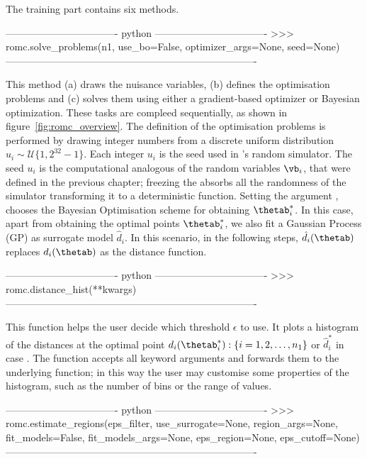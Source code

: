 The training part contains six methods.

\begin{Code}
---------------------------------- python ----------------------------------
>>> romc.solve_problems(n1,
                        use_bo=False,
                        optimizer_args=None,
                        seed=None)
----------------------------------------------------------------------------                    
\end{Code}

\noindent
This method (a) draws the nuisance variables, (b) defines the
optimisation problems and (c) solves them using either a
gradient-based optimizer or Bayesian optimization. These tasks are
compleed sequentially, as shown in figure~\ref{fig:romc_overview}. The
definition of the optimisation problems is performed by drawing
 integer numbers from a discrete uniform distribution
$u_i \sim \mathcal{U}\{1, 2^{32}-1\}$. Each integer $u_i$ is the seed
used in 's random simulator. The seed $u_i$ is the
computational analogous of the random variables $\vb_i$, that were
defined in the previous chapter; freezing the  absorbs all
the randomness of the simulator transforming it to a deterministic
function. Setting the argument , chooses the
Bayesian Optimisation scheme for obtaining $\thetab_i^*$. In this
case, apart from obtaining the optimal points $\thetab_i^*$, we also
fit a Gaussian Process (GP) as surrogate model $\hat{d}_i$. In this
scenario, in the following steps, $\hat{d}_i(\thetab)$ replaces
$d_i(\thetab)$ as the distance function.

\begin{Code}
---------------------------------- python ----------------------------------
>>> romc.distance_hist(**kwargs)
----------------------------------------------------------------------------  
\end{Code}

\noindent
This function helps the user decide which threshold $\epsilon$ to
use. It plots a histogram of the distances at the optimal point
$d_i(\thetab_i^*) : \{i = 1, 2, \ldots, n_1\}$ or $\hat{d}_i^*$ in case
. The function accepts all keyword arguments and
forwards them to the underlying  function; in
this way the user may customise some properties of the histogram, such
as the number of bins or the range of values.

\begin{Code}
---------------------------------- python ----------------------------------  
>>> romc.estimate_regions(eps_filter,
                          use_surrogate=None,
                          region_args=None,
                          fit_models=False,
                          fit_models_args=None,
                          eps_region=None,
                          eps_cutoff=None)
----------------------------------------------------------------------------
\end{Code}

